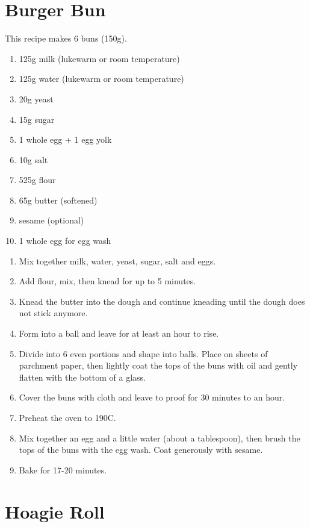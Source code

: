 \section{Burger Bun}
This recipe makes 6 buns (150g).

\begin{enumerate}
  \item 125g milk (lukewarm or room temperature)
  \item 125g water (lukewarm or room temperature)
  \item 20g yeast
  \item 15g sugar
  \item 1 whole egg + 1 egg yolk
  \item 10g salt
  \item 525g flour
  \item 65g butter (softened)
  \item sesame (optional)
  \item 1 whole egg for egg wash
\end{enumerate}

\begin{enumerate}
  \item Mix together milk, water, yeast, sugar, salt and eggs.
  \item Add flour, mix, then knead for up to 5 minutes.
  \item Knead the butter into the dough and continue kneading until the dough
  does not stick anymore.
  \item Form into a ball and leave for at least an hour to rise.
  \item Divide into 6 even portions and shape into balls. Place on sheets of
  parchment paper, then lightly coat the tops of the buns with oil and gently
  flatten with the bottom of a glass.
  \item Cover the buns with cloth and leave to proof for 30 minutes to an hour.
  \item Preheat the oven to 190C.
  \item Mix together an egg and a little water (about a tablespoon), then brush
  the tops of the buns with the egg wash. Coat generously with sesame.
  \item Bake for 17-20 minutes.
\end{enumerate}

\section{Hoagie Roll}
